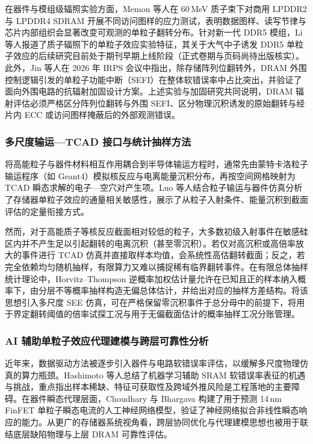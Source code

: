 在器件与模组级辐照实验方面，Memon 等人在 60\,MeV 质子束下对商用 LPDDR2 与 LPDDR4 SDRAM 开展不同访问图样的应力测试，表明数据图样、读写节律与芯片内部组织会显著改变可观测的单粒子翻转分布\cite{memon2025lpddrprotons}。针对新一代 DDR5 模组，Li 等人报道了质子辐照下的单粒子效应实验特征\cite{li2025ddr5protons}，其关于大气中子诱发 DDR5 单粒子效应的后续研究目前处于期刊早期上线阶段（正式卷期与页码尚待出版核实）\cite{li2026ddr5neutrons}。此外，Jin 等人在 2026 年 IRPS 会议中指出，除存储阵列位翻转外，DRAM 外围控制逻辑引发的单粒子功能中断（SEFI）在整体软错误率中占比突出，并验证了面向外围电路的抗辐射加固设计方案\cite{jin2026dramrhbd}。上述实验与加固研究共同说明，DRAM 辐射评估必须严格区分阵列位翻转与外围 SEFI、区分物理沉积诱发的原始翻转与经片内 ECC 或访问图样掩蔽后的外部观测错误。

\subsubsection{多尺度输运—TCAD 接口与统计抽样方法}
将高能粒子与器件材料相互作用耦合到半导体输运方程时，通常先由蒙特卡洛粒子输运程序（如 Geant4）模拟核反应与电离能量沉积分布，再按空间网格映射为 TCAD 瞬态求解的电子—空穴对产生项。Luo 等人结合粒子输运与器件仿真分析了存储器单粒子效应的通量相关敏感性，展示了从粒子入射条件、能量沉积到截面评估的定量衔接方式\cite{luo2018flux}。

然而，对于高能质子等核反应截面相对较低的粒子，大多数初级入射事件在敏感硅区内并不产生足以引起翻转的电离沉积（甚至零沉积）。若仅对高沉积或高倍率放大的事件进行 TCAD 仿真并直接取样本均值，会系统性高估翻转截面；反之，若完全依赖均匀随机抽样，有限算力又难以捕捉稀有临界翻转事件。在有限总体抽样统计理论中，Horvitz--Thompson 逆概率加权估计量允许在已知且正的样本纳入概率下，由分层不等概率抽样构造无偏总体估计，并给出对应的抽样方差结构\cite{horvitz1952sampling}。将该思想引入多尺度 SEE 仿真，可在严格保留零沉积事件于总分母中的前提下，将用于界定翻转阈值的倍率试探工况与用于无偏截面估计的概率抽样工况分账管理。

\subsubsection{AI 辅助单粒子效应代理建模与跨层可靠性分析}
近年来，数据驱动方法被逐步引入器件与电路软错误率评估，以缓解多尺度物理仿真的算力瓶颈。Hashimoto 等人总结了机器学习辅助 SRAM 软错误率表征的机遇与挑战，重点指出样本稀缺、特征可获取性及跨域外推风险是工程落地的主要障碍\cite{hashimoto2025sramml}。在器件瞬态代理层面，Choudhary 与 Bhargava 构建了用于预测 14\,nm FinFET 单粒子瞬态电流的人工神经网络模型，验证了神经网络拟合非线性瞬态响应的能力\cite{choudhary2025finfetsurrogate}。从更广的存储器系统视角看，跨层协同优化与代理建模思想也被用于联结底层缺陷物理与上层 DRAM 可靠性评估\cite{ji2026dramreliability}。

